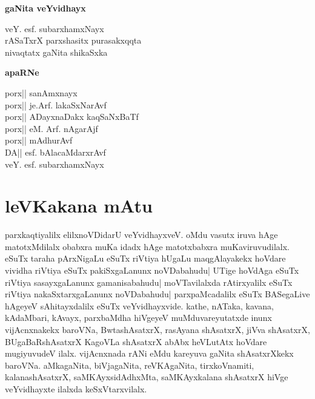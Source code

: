 \begin{center}
\textbf{\large{gaNita veYvidhayx}}
\end{center}

\vfill

\begin{center}
veY. esf. subarxhamxNayx\\
rASaTxrX parxshasitx purasakxqqta\\
nivaqtatx gaNita shikaSxka
\end{center}

\vfill

\newpage

\begin{center}
\textbf{\large{apaRNe}}
\end{center}

\begin{center}
porx|| sanAmxnayx\\
porx|| je.Arf. lakaSxNarAvf\\
porx|| ADayxnaDakx kaqSaNxBaTf\\
porx|| eM. Arf. nAgarAjf\\
porx|| mAdhurAvf\\
DA|| esf. bAlacaMdarxrAvf\\
veY. esf. subarxhamxNayx
\end{center}



\newpage


\chapter*{leVKakana mAtu}

parxkaqtiyalilx elilxnoVDidarU veYvidhayxveV. oMdu vasutx iruva hAge matotxMdilalx obabxra muKa idadx hAge matotxbabxra muKaviruvudilalx. eSuTx taraha pArxNigaLu eSuTx riVtiya hUgaLu maqgAlayakekx hoVdare vividha riVtiya eSuTx pakiSxgaLanunx noVDabahudu| UTige hoVdAga eSuTx riVtiya sasayxgaLanunx gamanisabahudu| moVTavilalxda rAtirxyalilx eSuTx riVtiya nakaSxtarxgaLanunx noVDabahudu| parxpaMcadalilx eSuTx BASegaLive hAgeyeV sAhitayxdalilx eSuTx veYvidhayxvide. kathe, nATaka, kavana, kAdaMbari, kAvayx, parxbaMdha hiVgeyeV muMduvareyutatxde inunx vijAcnxnakekx baroVNa, BwtashAsatxrX, rasAyana shAsatxrX, jiVva shAsatxrX, BUgaBaRshAsatxrX KagoVLa shAsatxrX abAbx heVLutAtx hoVdare mugiyuvudeV ilalx. vijAcnxnada rANi eMdu kareyuva gaNita shAsatxrXkekx baroVNa. aMkagaNita, biVjagaNita, reVKAgaNita, tirxkoVnamiti, kalanashAsatxrX, saMKAyxsidAdhxMta, saMKAyxkalana shAsatxrX hiVge veYvidhayxte ilalxda keSxVtarxvilalx.


